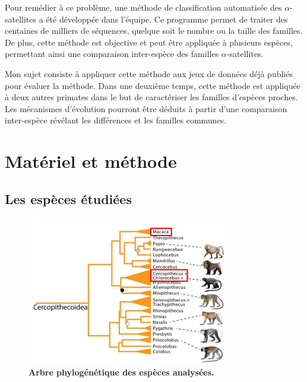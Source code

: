 \documentclass[12pt,a4paper]{article}
\begin{document}
Pour remédier à ce problème, une méthode de classification automatisée des $\alpha$-satellites a été développée dans l'équipe. Ce programme permet de traiter des centaines de milliers de séquences, quelque soit le nombre ou la taille des familles. De plus, cette méthode est objective et peut être appliquée à plusieurs espèces, permettant ainsi une comparaison inter-espèce des familles $\alpha$-satellites. 

Mon sujet consiste à appliquer cette méthode aux jeux de données déjà publiés pour évaluer la méthode. Dans une deuxième temps, cette méthode est appliquée à deux autres primates dans le but de  caractériser les familles d'espèces proches. Les mécanismes d'évolution pourront être déduits à partir d'une comparaison inter-espèce révélant les différences et les familles communes. 

\section{Matériel et méthode}
\subsection{Les espèces étudiées}

	\begin{figure}
		\center
		\includegraphics[height=6.5cm, width=9cm]{img/arbre_presentation.png}
		\caption{\textbf{Arbre phylogénétique des espèces analysées.}\cite{Springer2012}
		\label{fig:arbre_presentation}}
	\end{figure}
\end{document}
